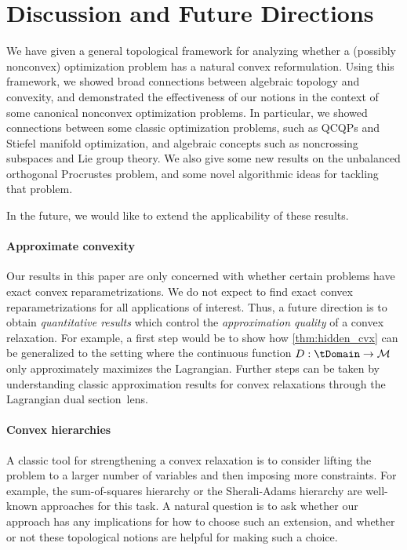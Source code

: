 \documentclass{article}
\numberwithin{equation}{section}
\newcommand{\cM}{{\mathcal{M}}}
\begin{document}
\section{Discussion and Future Directions}
We have given a general topological framework for analyzing whether a (possibly nonconvex) optimization problem has a natural convex reformulation. Using this framework, we showed broad connections between algebraic topology and convexity, and demonstrated the effectiveness of our notions in the context of some canonical nonconvex optimization problems. In particular, we showed connections between some classic optimization problems, such as QCQPs and Stiefel manifold optimization, and algebraic concepts such as noncrossing subspaces and Lie group theory. We also give some new results on the unbalanced orthogonal Procrustes problem, and some novel algorithmic ideas for tackling that problem.

In the future, we would like to extend the applicability of these results.


\paragraph{Approximate convexity} Our results in this paper are only concerned with whether certain problems have exact convex reparametrizations. 
We do not expect to find exact convex reparametrizations for all applications of interest.
Thus, a future direction is to obtain
\emph{quantitative results} which control the \emph{approximation quality} of a convex relaxation.
For example, 
a first step would be 
to show how \cref{thm:hidden_cvx} can be generalized to the setting where the continuous function 
$D : \tDomain \rightarrow \cM$  only approximately maximizes the Lagrangian. Further steps can be taken by understanding classic approximation results for convex relaxations through the Lagrangian dual section~lens.

\paragraph{Convex hierarchies} A classic tool for strengthening a convex relaxation is to consider lifting the problem to a larger number of variables and then imposing more constraints. For example, the sum-of-squares hierarchy or the Sherali-Adams hierarchy are well-known approaches for this task. A natural question is to ask whether our approach has any implications for how to choose such an extension, and whether or not these topological notions are helpful for making such a choice.
\end{document}
